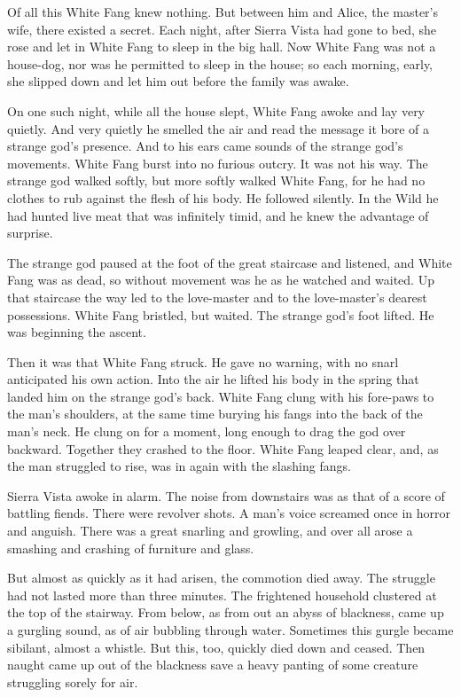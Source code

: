 \documentclass[10pt]{book}
\begin{document}
Of all this White Fang knew nothing. But between him and Alice, the
master’s wife, there existed a secret. Each night, after Sierra Vista
had gone to bed, she rose and let in White Fang to sleep in the big
hall. Now White Fang was not a house-dog, nor was he permitted to sleep
in the house; so each morning, early, she slipped down and let him out
before the family was awake.

On one such night, while all the house slept, White Fang awoke and lay
very quietly. And very quietly he smelled the air and read the message
it bore of a strange god’s presence. And to his ears came sounds of the
strange god’s movements. White Fang burst into no furious outcry. It
was not his way. The strange god walked softly, but more softly walked
White Fang, for he had no clothes to rub against the flesh of his body.
He followed silently. In the Wild he had hunted live meat that was
infinitely timid, and he knew the advantage of surprise.

The strange god paused at the foot of the great staircase and listened,
and White Fang was as dead, so without movement was he as he watched
and waited. Up that staircase the way led to the love-master and to the
love-master’s dearest possessions. White Fang bristled, but waited. The
strange god’s foot lifted. He was beginning the ascent.

Then it was that White Fang struck. He gave no warning, with no snarl
anticipated his own action. Into the air he lifted his body in the
spring that landed him on the strange god’s back. White Fang clung with
his fore-paws to the man’s shoulders, at the same time burying his
fangs into the back of the man’s neck. He clung on for a moment, long
enough to drag the god over backward. Together they crashed to the
floor. White Fang leaped clear, and, as the man struggled to rise, was
in again with the slashing fangs.

Sierra Vista awoke in alarm. The noise from downstairs was as that of a
score of battling fiends. There were revolver shots. A man’s voice
screamed once in horror and anguish. There was a great snarling and
growling, and over all arose a smashing and crashing of furniture and
glass.

But almost as quickly as it had arisen, the commotion died away. The
struggle had not lasted more than three minutes. The frightened
household clustered at the top of the stairway. From below, as from out
an abyss of blackness, came up a gurgling sound, as of air bubbling
through water. Sometimes this gurgle became sibilant, almost a whistle.
But this, too, quickly died down and ceased. Then naught came up out of
the blackness save a heavy panting of some creature struggling sorely
for air.
\end{document}
